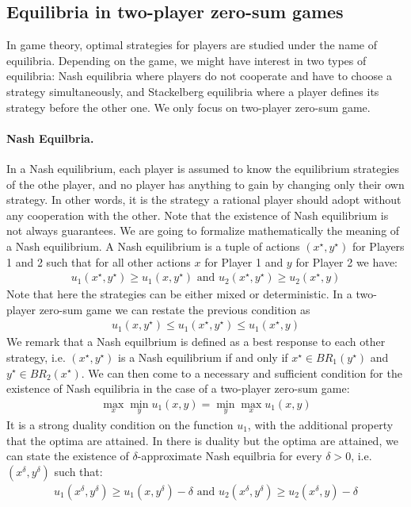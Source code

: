 \subsection{Equilibria in two-player zero-sum games}



In game theory, optimal strategies for players are studied under the name of equilibria. Depending on the game, we might have interest in two types of equilibria: Nash equilibria where players do not cooperate and have to choose a strategy simultaneously, and Stackelberg equilibria where a player defines its strategy before the other one. We only focus on two-player zero-sum game.

\paragraph{Nash Equilbria.} In a Nash equilibrium, each player is assumed to know the equilibrium strategies of the othe player, and no player has anything to gain by changing only their own strategy. In other words, it is the strategy a rational player should adopt without any cooperation with the other. Note that the existence of Nash equilibrium is not always guarantees. We are going to formalize mathematically the meaning of a Nash equilibrium. A Nash equilibrium is a tuple of actions $(x^\star,y^\star)$ for Players 1 and 2 such that for all other actions $x$ for Player 1 and $y$ for Player 2 we have:
\begin{align*}
    u_1(x^\star,y^\star)\geq u_1(x,y^\star)\text{ and } u_2(x^\star,y^\star)\geq u_2(x^\star,y)
\end{align*}
Note that here the strategies can be either mixed or deterministic. In a two-player zero-sum game we can restate the previous condition as 
\begin{align*}
    u_1(x,y^\star)\leq u_1(x^\star,y^\star)\leq u_1(x^\star,y)
\end{align*}
We remark that a Nash equilbrium is defined as a best response to each other strategy, i.e. $(x^\star,y^\star)$ is a Nash equilibrium if and only if $x^\star\in BR_1(y^\star)$ and $y^\star\in BR_2(x^\star)$. We can then come to a necessary and sufficient condition for the existence of Nash equilibria in the case of a two-player zero-sum game:
\begin{align*}
    \max_x\min_y u_1(x,y) = \min_y\max_x u_1(x,y)
\end{align*}
It is a strong duality condition on the function $u_1$, with the additional property that the optima are attained. In there is duality but the optima are attained, we can state the existence of $\delta$-approximate Nash equilbria for every $\delta>0$, i.e. $(x^\delta,y^\delta)$ such that:
\begin{align*}
    u_1(x^\delta,y^\delta)\geq u_1(x,y^\delta)-\delta\text{ and } u_2(x^\delta,y^\delta)\geq u_2(x^\delta,y)-\delta
\end{align*}


